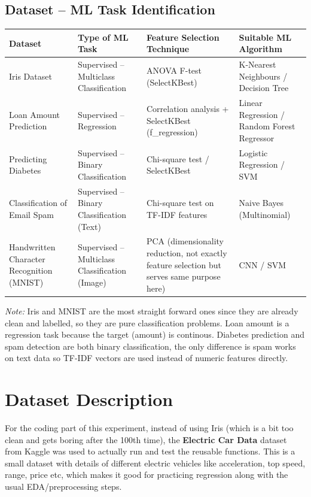 \documentclass[12pt,a4paper]{article}
\begin{document}
\subsection*{Dataset -- ML Task Identification}
\begin{longtable}{|p{3.2cm}|p{2.6cm}|p{3.4cm}|p{4cm}|}
\hline
\textbf{Dataset} & \textbf{Type of ML Task} & \textbf{Feature Selection Technique} & \textbf{Suitable ML Algorithm} \\ \hline
Iris Dataset & Supervised -- Multiclass Classification & ANOVA F-test (SelectKBest) & K-Nearest Neighbours / Decision Tree \\ \hline
Loan Amount Prediction & Supervised -- Regression & Correlation analysis + SelectKBest (f\_regression) & Linear Regression / Random Forest Regressor \\ \hline
Predicting Diabetes & Supervised -- Binary Classification & Chi-square test / SelectKBest & Logistic Regression / SVM \\ \hline
Classification of Email Spam & Supervised -- Binary Classification (Text) & Chi-square test on TF-IDF features & Naive Bayes (Multinomial) \\ \hline
Handwritten Character Recognition (MNIST) & Supervised -- Multiclass Classification (Image) & PCA (dimensionality reduction, not exactly feature selection but serves same purpose here) & CNN / SVM \\ \hline
\end{longtable}

\textit{Note: } Iris and MNIST are the most straight forward ones since they are already clean and labelled, so they are pure classification problems. Loan amount is a regression task because the target (amount) is continous. Diabetes prediction and spam detection are both binary classification, the only difference is spam works on text data so TF-IDF vectors are used instead of numeric features directly.

\section{Dataset Description}
For the coding part of this experiment, instead of using Iris (which is a bit too clean and gets boring after the 100th time), the \textbf{Electric Car Data} dataset from Kaggle was used to actually run and test the reusable functions. This is a small dataset with details of different electric vehicles like acceleration, top speed, range, price etc, which makes it good for practicing regression along with the usual EDA/preprocessing steps.
\end{document}
